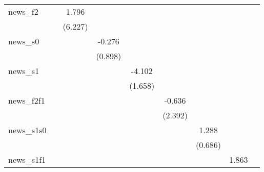 {\begin{tabular}{l*{8}{c}}
\addlinespace
news\_f2     &                     &       1.796         &                     &                     &                     &                     &                     &                     \\
            &                     &     (6.227)         &                     &                     &                     &                     &                     &                     \\
\addlinespace
news\_s0     &                     &                     &      -0.276         &                     &                     &                     &                     &                     \\
            &                     &                     &     (0.898)         &                     &                     &                     &                     &                     \\
\addlinespace
news\_s1     &                     &                     &                     &      -4.102\sym{**} &                     &                     &                     &                     \\
            &                     &                     &                     &     (1.658)         &                     &                     &                     &                     \\
\addlinespace
news\_f2f1   &                     &                     &                     &                     &      -0.636         &                     &                     &                     \\
            &                     &                     &                     &                     &     (2.392)         &                     &                     &                     \\
\addlinespace
news\_s1s0   &                     &                     &                     &                     &                     &       1.288\sym{*}  &                     &                     \\
            &                     &                     &                     &                     &                     &     (0.686)         &                     &                     \\
\addlinespace
news\_s1f1   &                     &                     &                     &                     &                     &                     &       1.863         &                     \\

\end{tabular}}
